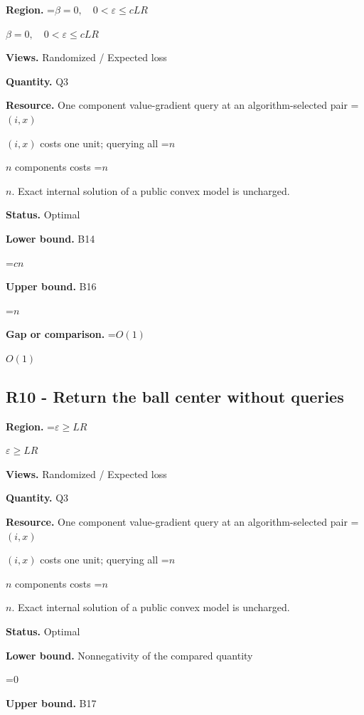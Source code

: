 \documentclass[10pt,a4paper]{article}
\newcommand{\AtlasMath}[1]{\par\begingroup\centering\setbox0=\hbox{$\displaystyle #1$}\ifdim\wd0>1.4\linewidth\typeout{ATLAS WIDE FORMULA: \the\wd0}\fi\ifdim\wd0>\linewidth\resizebox{\linewidth}{!}{\box0}\else\box0\fi\par\endgroup}
\newcommand{\AtlasInlineMath}[1]{\begingroup\setbox0=\hbox{$#1$}\ifdim\wd0>.4\linewidth\endgroup\AtlasMath{#1}\else\endgroup$#1$\fi}
\begin{document}
\textbf{Region.} \AtlasInlineMath{\beta=0,\quad0<\varepsilon\le cLR}



\textbf{Views.} Randomized / Expected loss



\textbf{Quantity.} Q3



\textbf{Resource.} One component value-gradient query at an algorithm-selected pair \AtlasInlineMath{(i,x)} costs one unit; querying all \AtlasInlineMath{n} components costs \AtlasInlineMath{n}. Exact internal solution of a public convex model is uncharged.



\textbf{Status.} Optimal



\textbf{Lower bound.} B14



\AtlasMath{cn}


\textbf{Upper bound.} B16



\AtlasMath{n}


\textbf{Gap or comparison.} \AtlasInlineMath{O(1)}



\subsection{R10 - Return the ball center without queries}


\textbf{Region.} \AtlasInlineMath{\varepsilon\ge LR}



\textbf{Views.} Randomized / Expected loss



\textbf{Quantity.} Q3



\textbf{Resource.} One component value-gradient query at an algorithm-selected pair \AtlasInlineMath{(i,x)} costs one unit; querying all \AtlasInlineMath{n} components costs \AtlasInlineMath{n}. Exact internal solution of a public convex model is uncharged.



\textbf{Status.} Optimal



\textbf{Lower bound.} Nonnegativity of the compared quantity



\AtlasMath{0}


\textbf{Upper bound.} B17
\end{document}
